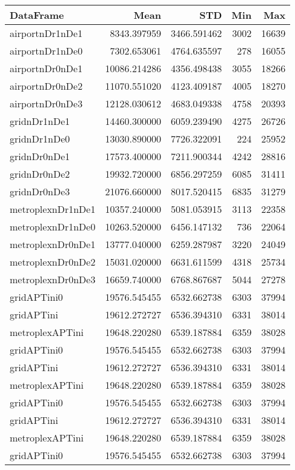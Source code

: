 \begin{tabular}{lrrrr}
\toprule
DataFrame & Mean & STD & Min & Max \\
\midrule
airportnDr1nDe1 & 8343.397959 & 3466.591462 & 3002 & 16639 \\
airportnDr1nDe0 & 7302.653061 & 4764.635597 & 278 & 16055 \\
airportnDr0nDe1 & 10086.214286 & 4356.498438 & 3055 & 18266 \\
airportnDr0nDe2 & 11070.551020 & 4123.409187 & 4005 & 18270 \\
airportnDr0nDe3 & 12128.030612 & 4683.049338 & 4758 & 20393 \\
gridnDr1nDe1 & 14460.300000 & 6059.239490 & 4275 & 26726 \\
gridnDr1nDe0 & 13030.890000 & 7726.322091 & 224 & 25952 \\
gridnDr0nDe1 & 17573.400000 & 7211.900344 & 4242 & 28816 \\
gridnDr0nDe2 & 19932.720000 & 6856.297259 & 6085 & 31411 \\
gridnDr0nDe3 & 21076.660000 & 8017.520415 & 6835 & 31279 \\
metroplexnDr1nDe1 & 10357.240000 & 5081.053915 & 3113 & 22358 \\
metroplexnDr1nDe0 & 10263.520000 & 6456.147132 & 736 & 22064 \\
metroplexnDr0nDe1 & 13777.040000 & 6259.287987 & 3220 & 24049 \\
metroplexnDr0nDe2 & 15031.020000 & 6631.611599 & 4318 & 25734 \\
metroplexnDr0nDe3 & 16659.740000 & 6768.867687 & 5044 & 27278 \\
gridAPTini0 & 19576.545455 & 6532.662738 & 6303 & 37994 \\
gridAPTini & 19612.272727 & 6536.394310 & 6331 & 38014 \\
metroplexAPTini & 19648.220280 & 6539.187884 & 6359 & 38028 \\
gridAPTini0 & 19576.545455 & 6532.662738 & 6303 & 37994 \\
gridAPTini & 19612.272727 & 6536.394310 & 6331 & 38014 \\
metroplexAPTini & 19648.220280 & 6539.187884 & 6359 & 38028 \\
gridAPTini0 & 19576.545455 & 6532.662738 & 6303 & 37994 \\
gridAPTini & 19612.272727 & 6536.394310 & 6331 & 38014 \\
metroplexAPTini & 19648.220280 & 6539.187884 & 6359 & 38028 \\
gridAPTini0 & 19576.545455 & 6532.662738 & 6303 & 37994 \\

\end{tabular}
